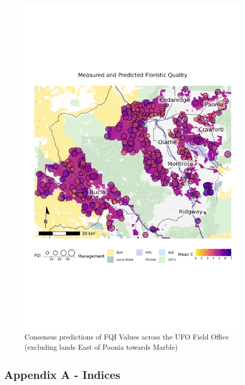 \documentclass[
]{article}
\begin{document}
\begin{figure}

\includegraphics[width=0.95\linewidth]{../plots/maps/FQI} \hfill{}

\caption{Consensus predictions of FQI Values across the UFO Field Office (excluding lands East of Paonia towards Marble)}\label{fig:Map results}
\end{figure}

\newpage

\hypertarget{appendix-a---indices}{%
\subsection{Appendix A - Indices}\label{appendix-a---indices}}

\strut \\
\strut \\
\strut \\
\end{document}
